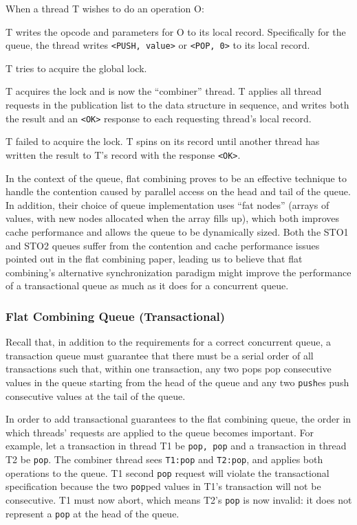 When a thread T wishes to do an operation O:
\begin{ordlist}
    \item T writes the opcode and parameters for O to its local record. Specifically for the queue, the thread writes \texttt{<PUSH, value>} or \texttt{<POP, 0>} to its local record.
   \item T tries to acquire the global lock.
   \begin{ordlist}
        \item T acquires the lock and is now the “combiner” thread. T applies all thread requests in the publication list to the data structure in sequence, and writes both the result and an \texttt{<OK>} response to each requesting thread’s local record.
        \item T failed to acquire the lock. T spins on its record until another thread has written the result to T’s record with the response \texttt{<OK>}.
    \end{ordlist}
\end{ordlist}

In the context of the queue, flat combining proves to be an effective technique to handle the contention caused by parallel access on the head and tail of the queue. In addition, their choice of queue implementation uses “fat nodes” (arrays of values, with new nodes allocated when the array fills up), which both improves cache performance and allows the queue to be dynamically sized. Both the STO1 and STO2 queues suffer from the contention and cache performance issues pointed out in the flat combining paper, leading us to believe that flat combining’s alternative synchronization paradigm might improve the performance of a transactional queue as much as it does for a concurrent queue.

\subsubsection{Flat Combining Queue (Transactional)}

Recall that, in addition to the requirements for a correct concurrent queue, a transaction queue must guarantee that there must be a serial order of all transactions such that, within one transaction, any two pops pop consecutive values in the queue starting from the head of the queue and any two \texttt{push}es push consecutive values at the tail of the queue.

In order to add transactional guarantees to the flat combining queue, the order in which threads’ requests are applied to the queue becomes important. For example, let a transaction in thread T1 be \texttt{pop, pop} and a transaction in thread T2 be \texttt{pop}. The combiner thread sees \texttt{T1:pop} and \texttt{T2:pop}, and applies both operations to the queue. T1 second \texttt{pop} request will violate the transactional specification because the two \texttt{pop}ped values in T1’s transaction will not be consecutive. T1 must now abort, which means T2’s \texttt{pop} is now invalid: it does not represent a \texttt{pop} at the head of the queue.

